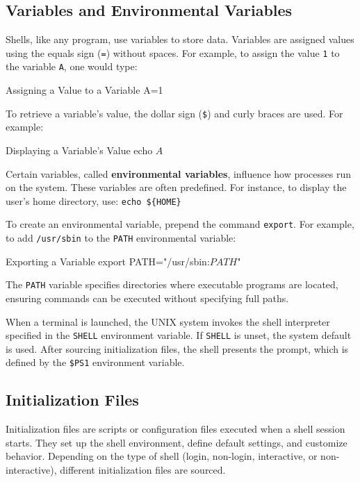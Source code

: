 \subsection{Variables and Environmental Variables}

Shells, like any program, use variables to store data. Variables are assigned values using the equals sign (\texttt{=}) without spaces. For example, to assign the value \texttt{1} to the variable \texttt{A}, one would type:

\begin{neonlisting}[language=bash]{Assigning a Value to a Variable}
A=1
\end{neonlisting}

To retrieve a variable's value, the dollar sign (\texttt{\$}) and curly braces are used. For example:

\begin{neonlisting}[language=bash]{Displaying a Variable's Value}
echo ${A}$
\end{neonlisting}

Certain variables, called \textbf{environmental variables}, influence how processes run on the system. These variables are often predefined. For instance, to display the user’s home directory, use: \texttt{echo \$\{HOME\}}

To create an environmental variable, prepend the command \texttt{export}. For example, to add \texttt{/usr/sbin} to the \texttt{PATH} environmental variable:

\begin{neonlisting}[language=bash]{Exporting a Variable}
export PATH="/usr/sbin:$PATH$"
\end{neonlisting}

The \texttt{PATH} variable specifies directories where executable programs are located, ensuring commands can be executed without specifying full paths.

When a terminal is launched, the UNIX system invokes the shell interpreter specified in the \texttt{SHELL} environment variable. If \texttt{SHELL} is unset, the system default is used. After sourcing initialization files, the shell presents the prompt, which is defined by the \texttt{\$PS1} environment variable.

\subsection{Initialization Files}

Initialization files are scripts or configuration files executed when a shell session starts. They set up the shell environment, define default settings, and customize behavior. Depending on the type of shell (login, non-login, interactive, or non-interactive), different initialization files are sourced.

